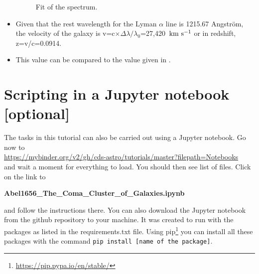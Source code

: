 \documentclass [a4paper, 12pt]{article}
\begin{document}
\begin{itemize}
\begin{figure}[H]
\caption{Fit of the spectrum.}
\label{fig:specfit}
\end{figure}
\item Given that the rest wavelength for the Lyman $\alpha$ line is 1215.67 Angstr\"om, the velocity of the galaxy is v=c$\times\Delta\lambda/\lambda_0$=27,420~$\rm km\ s^{-1}$ or in redshift, z=v/c=0.0914.

\item This value can be compared to the value given in \simbad.
\end{itemize}

\section{Scripting in a Jupyter notebook [optional]}

The tasks in this tutorial can also be carried out using a Jupyter notebook.
Go now to\\
\url{https://mybinder.org/v2/gh/cds-astro/tutorials/master?filepath=Notebooks}\\
and wait a moment for everything to load. You should then see list of files.
Click on the link to

\textbf{Abel1656\_The\_Coma\_Cluster\_of\_Galaxies.ipynb}

\noindent and follow the instructions there. You can also download the Jupyter
notebook from the github repository to your machine. It was created to run with
the packages as listed in the requirements.txt file. Using
pip\footnote{\url{https://pip.pypa.io/en/stable/}} you can install all these
packages with the command \texttt{pip install [name of the package]}.

%
\end{document}
